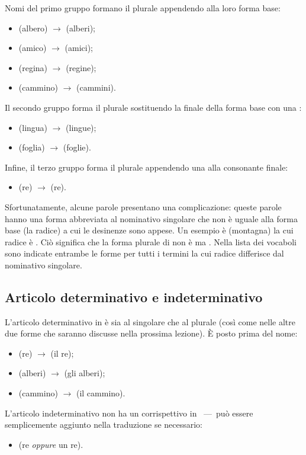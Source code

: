 Nomi del primo gruppo formano il plurale appendendo  alla loro forma base:
\begin{itemize}
  \item {} (albero) $\rightarrow$  (alberi);
  \item {} (amico) $\rightarrow$  (amici);
  \item {} (regina) $\rightarrow$  (regine);
  \item {} (cammino) $\rightarrow$  (cammini).
\end{itemize}
Il secondo gruppo forma il plurale sostituendo la  finale della forma base
con una :
\begin{itemize}
  \item {} (lingua) $\rightarrow$  (lingue);
  \item {} (foglia) $\rightarrow$  (foglie).
\end{itemize}
Infine, il terzo gruppo forma il plurale appendendo una  alla consonante
finale:
\begin{itemize}
  \item {} (re) $\rightarrow$  (re).
\end{itemize}
Sfortunatamente, alcune parole presentano una complicazione: queste parole hanno
una forma abbreviata al nominativo singolare che non è uguale alla forma base
(la radice) a cui le desinenze sono appese. Un esempio è  (montagna) la
cui radice è . Ciò significa che la forma plurale di  non è
 ma .
Nella lista dei vocaboli sono indicate entrambe le forme per tutti i termini la
cui radice differisce dal nominativo singolare.

\subsection{Articolo determinativo e indeterminativo}
L'articolo determinativo in \quenya è  sia al singolare che al plurale
(così come nelle altre due forme che saranno discusse nella prossima lezione). È posto
prima del nome:
\begin{itemize}
  \item {} (re) $\rightarrow$  (il re);
  \item {} (alberi) $\rightarrow$  (gli alberi);
  \item {} (cammino) $\rightarrow$  (il cammino).
\end{itemize}
L'articolo indeterminativo non ha un corrispettivo in \quenya~---~può essere
semplicemente aggiunto nella traduzione se necessario:
\begin{itemize}
  \item {} (re \emph{oppure} un re).
\end{itemize}

